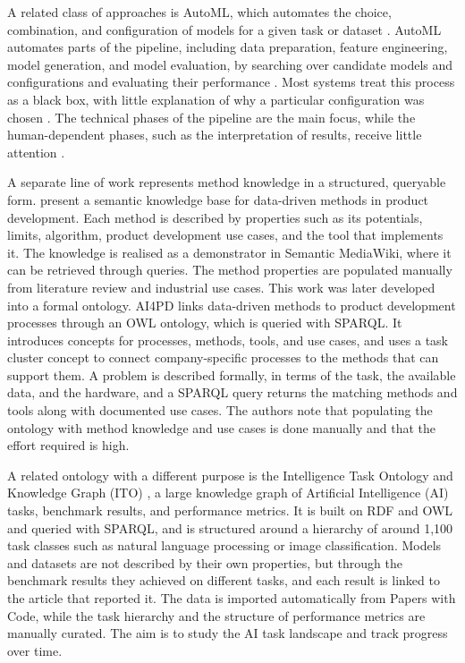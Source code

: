 A related class of approaches is AutoML, which automates the choice,
combination, and configuration of models for a given task or dataset
\parencite{waring2020automated_machine_learning_review_state_of_the_art_opportunities_healthcare}.
AutoML automates parts of the pipeline, including data preparation,
feature engineering, model generation, and model evaluation, by searching
over candidate models and configurations and evaluating their performance
\parencite{he2021automl_survey_state_of_the_art}. Most
systems treat this process as a black box, with little
explanation of why a particular configuration was chosen
\parencite{barbudo2023eight_years_automl_categorisation_review_trends}.
The technical phases of the pipeline are the main focus,
while the human-dependent phases, such as the interpretation of results,
receive little attention
\parencite{barbudo2023eight_years_automl_categorisation_review_trends}.

A separate line of work represents method knowledge in a 
structured, queryable form. 
\textcite{gerschutz2021semantic_web_approach} present a 
semantic knowledge base for data-driven methods in product 
development. Each method is described by properties such as 
its potentials, limits, algorithm, product development use 
cases, and the tool that implements it. The knowledge is 
realised as a demonstrator in Semantic MediaWiki, where it can 
be retrieved through queries. The method properties are 
populated manually from literature review and industrial use 
cases. This work was later developed into a formal ontology. 
AI4PD \parencite{gerschutz2023_AI4PD} links data-driven methods 
to product development processes through an OWL ontology, 
which is queried with SPARQL. It introduces 
concepts for processes, methods, tools, and use cases, and 
uses a task cluster concept to connect company-specific 
processes to the methods that can support them. A problem is 
described formally, in terms of the task, the available data, 
and the hardware, and a SPARQL query returns the matching 
methods and tools along with documented use cases. The 
authors note that populating the ontology with method 
knowledge and use cases is done manually and that the effort 
required is high.

A related ontology with a different purpose is the 
Intelligence Task Ontology and Knowledge Graph (ITO) 
\parencite{blagec2022_benchmark_knowledge_graph}, a large 
knowledge graph of Artificial Intelligence (AI) tasks, benchmark results, and 
performance metrics. It is built on RDF and OWL and queried 
with SPARQL, and is structured around a hierarchy of around 
1,100 task classes such as natural language processing or 
image classification. Models and datasets are not described 
by their own properties, but through the benchmark results 
they achieved on different tasks, and each result is linked 
to the article that reported it. The data is imported 
automatically from Papers with Code, while the task hierarchy 
and the structure of performance metrics are manually curated. 
The aim is to study the AI task landscape and track progress 
over time.


